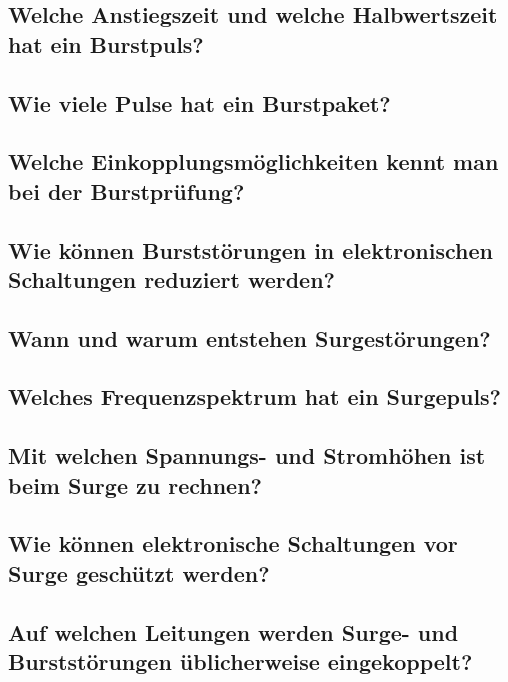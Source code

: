 \subsection{Welche Anstiegszeit und welche Halbwertszeit hat ein Burstpuls?}

\subsection{Wie viele Pulse hat ein Burstpaket?}

\subsection{Welche Einkopplungsmöglichkeiten kennt man bei der Burstprüfung?}

\subsection{Wie können Burststörungen in elektronischen Schaltungen reduziert werden?}

\subsection{Wann und warum entstehen Surgestörungen?}

\subsection{Welches Frequenzspektrum hat ein Surgepuls?}

\subsection{Mit welchen Spannungs- und Stromhöhen ist beim Surge zu rechnen?}

\subsection{Wie können elektronische Schaltungen vor Surge geschützt werden?}

\subsection{Auf welchen Leitungen werden Surge- und Burststörungen üblicherweise eingekoppelt?}

\pagebreak
